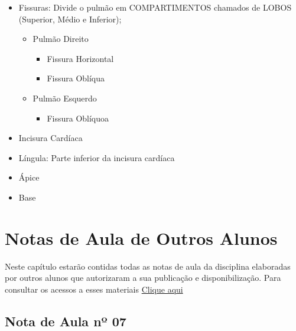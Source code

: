 \documentclass[
]{book}
\providecommand{\tightlist}{%
  \setlength{\itemsep}{0pt}\setlength{\parskip}{0pt}}
\begin{document}
\begin{itemize}
\tightlist
\item
  Fissuras: Divide o pulmão em COMPARTIMENTOS chamados de LOBOS (Superior, Médio e Inferior);

  \begin{itemize}
  \tightlist
  \item
    Pulmão Direito

    \begin{itemize}
    \tightlist
    \item
      Fissura Horizontal
    \item
      Fissura Oblíqua
    \end{itemize}
  \item
    Pulmão Esquerdo

    \begin{itemize}
    \tightlist
    \item
      Fissura Oblíquoa
    \end{itemize}
  \end{itemize}
\item
  Incisura Cardíaca
\item
  Língula: Parte inferior da incisura cardíaca
\item
  Ápice
\item
  Base
\end{itemize}

\hypertarget{notas-de-aula-de-outros-alunos}{%
\chapter{Notas de Aula de Outros Alunos}\label{notas-de-aula-de-outros-alunos}}

Neste capítulo estarão contidas todas as notas de aula da disciplina elaboradas por outros alunos que autorizaram a sua publicação e disponibilização. Para consultar os acessos a esses materiais \href{https://app.bitly.com/Bi6shp8v5bx/bitlinks/3ruv6mM/details?filterActive=true\&tags=Anatomia}{Clique aqui}

\hypertarget{nota-de-aula-nuxba-07-1}{%
\section{Nota de Aula nº 07}\label{nota-de-aula-nuxba-07-1}}
\end{document}
